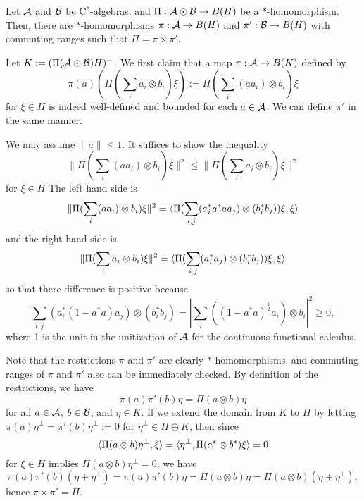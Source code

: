 \documentclass{../../../small}
\begin{document}
\begin{lem}
Let $\mathcal{A}$ and $\mathcal{B}$ be C$^*$-algebras. and $\Pi:\mathcal{A}\odot\mathcal{B}\to B(H)$ be a $*$-homomorphism.
Then, there are $*$-homomorphisms $\pi:\mathcal{A}\to B(H)$ and $\pi':\mathcal{B}\to B(H)$ with commuting ranges such that $\Pi=\pi\times\pi'$.
\end{lem}
\begin{pf}
Let $K:=(\Pi(\mathcal{A}\odot\mathcal{B})H)^-$.
We first claim that a map $\pi:\mathcal{A}\to B(K)$ defined by
\[\pi(a)(\Pi(\sum_ia_i\otimes b_i)\xi):=\Pi(\sum_i(aa_i)\otimes b_i)\xi\]
for $\xi\in H$ is indeed well-defined and bounded for each $a\in\mathcal{A}$.
We can define $\pi'$ in the same manner.

We may assume $\|a\|\le1$.
It suffices to show the inequality
\[\|\Pi(\sum_i(aa_i)\otimes b_i)\xi\|^2\le\|\Pi(\sum_ia_i\otimes b_i)\xi\|^2\]
for $\xi\in H$
The left hand side is
\[\|\Pi(\sum_i(aa_i)\otimes b_i)\xi\|^2
=\langle\Pi(\sum_{i,j}(a_i^*a^*aa_j)\otimes(b_i^*b_j))\xi,\xi\rangle\]
and the right hand side is
\[\|\Pi(\sum_ia_i\otimes b_i)\xi\|^2
=\langle\Pi(\sum_{i,j}(a_i^*a_j)\otimes(b_i^*b_j))\xi,\xi\rangle\]
so that there difference is positive because
\[\sum_{i,j}(a_i^*(1-a^*a)a_j)\otimes(b_i^*b_j)=|\sum_i((1-a^*a)^{\frac12}a_i)\otimes b_i|^2\ge0,\]
where 1 is the unit in the unitization of $\mathcal{A}$ for the continuous functional calculus.

Note that the restrictions $\pi$ and $\pi'$ are clearly $*$-homomorphisms, and commuting ranges of $\pi$ and $\pi'$ also can be immediately checked.
By definition of the restrictions, we have
\[\pi(a)\pi'(b)\eta=\Pi(a\otimes b)\eta\]
for all $a\in\mathcal{A}$, $b\in\mathcal{B}$, and $\eta\in K$.
If we extend the domain from $K$ to $H$ by letting $\pi(a)\eta^\perp=\pi'(b)\eta^\perp:=0$ for $\eta^\perp\in H\ominus K$, then since
\[\langle\Pi(a\otimes b)\eta^\perp,\xi\rangle=\langle\eta^\perp,\Pi(a^*\otimes b^*)\xi\rangle=0\]
for $\xi\in H$ implies $\Pi(a\otimes b)\eta^\perp=0$, we have
\[\pi(a)\pi'(b)(\eta+\eta^\perp)=\pi(a)\pi'(b)\eta=\Pi(a\otimes b)\eta=\Pi(a\otimes b)(\eta+\eta^\perp),\]
hence $\pi\times\pi'=\Pi$.
\end{pf}
\end{document}
